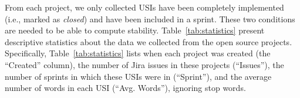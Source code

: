 
From each project, we only collected USIs have been completely implemented (i.e., marked as \emph{closed}) and have been included in a sprint. 
These two conditions are needed to be able to compute stability. 
Table~\ref{tab:statistics} present descriptive statistics about the data we collected from the open source projects. 
Specifically, Table~\ref{tab:statistics} lists when each project was created (the ``Created'' column), the number of Jira issues in these projects (``Issues''), 
the number of sprints in which these USIs were in (``Sprint''), 
and the average number of words in each USI (``Avg. Words''), ignoring stop words. 


